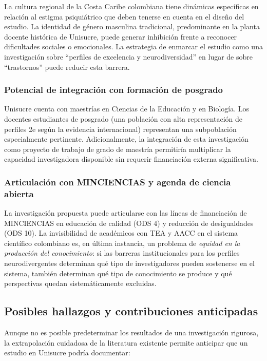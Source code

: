 La cultura regional de la Costa Caribe colombiana tiene dinámicas específicas
en relación al estigma psiquiátrico que deben tenerse en cuenta en el diseño
del estudio. La identidad de género masculina tradicional, predominante en la
planta docente histórica de Unisucre, puede generar inhibición frente a reconocer
dificultades sociales o emocionales. La estrategia de enmarcar el estudio como
una investigación sobre ``perfiles de excelencia y neurodiversidad'' en lugar de
sobre ``trastornos'' puede reducir esta barrera.

\subsubsection{Potencial de integración con formación de posgrado}

Unisucre cuenta con maestrías en Ciencias de la Educación y en Biología.
Los docentes estudiantes de posgrado (una población con alta representación
de perfiles 2e según la evidencia internacional) representan una subpoblación
especialmente pertinente. Adicionalmente, la integración de esta investigación
como proyecto de trabajo de grado de maestría permitiría multiplicar la capacidad
investigadora disponible sin requerir financiación externa significativa.

\subsubsection{Articulación con MINCIENCIAS y agenda de ciencia abierta}

La investigación propuesta puede articularse con las líneas de financiación de
MINCIENCIAS en educación de calidad (ODS 4) y reducción de desigualdades (ODS 10).
La invisibilidad de académicos con TEA y AACC en el sistema científico colombiano
es, en última instancia, un problema de \textit{equidad en la producción del
conocimiento}: si las barreras institucionales para los perfiles neurodivergentes
determinan qué tipo de investigadores pueden sostenerse en el sistema, también
determinan qué tipo de conocimiento se produce y qué perspectivas quedan
sistemáticamente excluidas.

\subsection{Posibles hallazgos y contribuciones anticipadas}

Aunque no es posible predeterminar los resultados de una investigación rigurosa,
la extrapolación cuidadosa de la literatura existente permite anticipar que un
estudio en Unisucre podría documentar:

